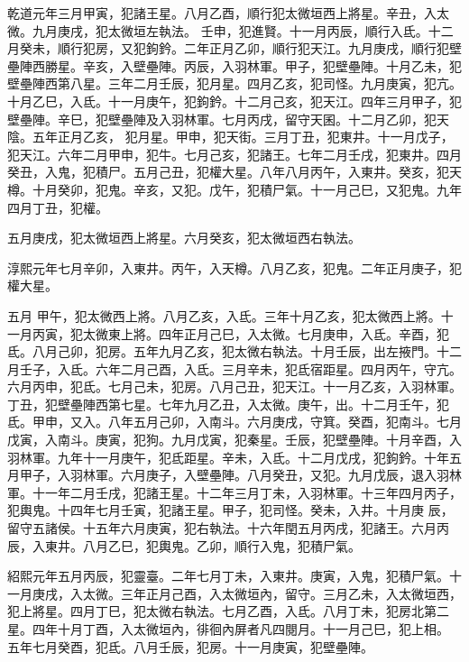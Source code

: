 \begin{pinyinscope}
 乾道元年三月甲寅，犯諸王星。八月乙酉，順行犯太微垣西上將星。辛丑，入太微。九月庚戌，犯太微垣左執法。
 壬申，犯進賢。十一月丙辰，順行入氐。十二月癸未，順行犯房，又犯鉤鈐。二年正月乙卯，順行犯天江。九月庚戌，順行犯壁壘陣西勝星。辛亥，入壁壘陣。丙辰，入羽林軍。甲子，犯壁壘陣。十月乙未，犯壁壘陣西第八星。三年二月壬辰，犯月星。四月乙亥，犯司怪。九月庚寅，犯亢。十月乙巳，入氐。十一月庚午，犯鉤鈐。十二月己亥，犯天江。四年三月甲子，犯壁壘陣。辛巳，犯壁壘陣及入羽林軍。七月丙戌，留守天囷。十二月乙卯，犯天陰。五年正月乙亥，
 犯月星。甲申，犯天街。三月丁丑，犯東井。十一月戊子，犯天江。六年二月甲申，犯牛。七月己亥，犯諸王。七年二月壬戌，犯東井。四月癸丑，入鬼，犯積尸。五月己丑，犯權大星。八年八月丙午，入東井。癸亥，犯天樽。十月癸卯，犯鬼。辛亥，又犯。戊午，犯積尸氣。十一月己巳，又犯鬼。九年四月丁丑，犯權。



 五月庚戌，犯太微垣西上將星。六月癸亥，犯太微垣西右執法。



 淳熙元年七月辛卯，入東井。丙午，入天樽。八月乙亥，犯鬼。二年正月庚子，犯權大星。



 五月
 甲午，犯太微西上將。八月乙亥，入氐。三年十月乙亥，犯太微西上將。十一月丙寅，犯太微東上將。四年正月己巳，入太微。七月庚申，入氐。辛酉，犯氐。八月己卯，犯房。五年九月乙亥，犯太微右執法。十月壬辰，出左掖門。十二月壬子，入氐。六年二月己酉，入氐。三月辛未，犯氐宿距星。四月丙午，守亢。六月丙申，犯氐。七月己未，犯房。八月己丑，犯天江。十一月乙亥，入羽林軍。丁丑，犯壁壘陣西第七星。七年九月乙丑，入太微。庚午，出。十二月壬午，犯
 氐。甲申，又入。八年五月己卯，入南斗。六月庚戌，守箕。癸酉，犯南斗。七月戊寅，入南斗。庚寅，犯狗。九月戊寅，犯秦星。壬辰，犯壁壘陣。十月辛酉，入羽林軍。九年十一月庚午，犯氐距星。辛未，入氐。十二月戊戌，犯鉤鈐。十年五月甲子，入羽林軍。六月庚子，入壁壘陣。八月癸丑，又犯。九月戊辰，退入羽林軍。十一年二月壬戌，犯諸王星。十二年三月丁未，入羽林軍。十三年四月丙子，犯輿鬼。十四年七月壬寅，犯諸王星。甲子，犯司怪。癸未，入井。十月庚
 辰，留守五諸侯。十五年六月庚寅，犯右執法。十六年閏五月丙戌，犯諸王。六月丙辰，入東井。八月乙巳，犯輿鬼。乙卯，順行入鬼，犯積尸氣。



 紹熙元年五月丙辰，犯靈臺。二年七月丁未，入東井。庚寅，入鬼，犯積尸氣。十一月庚戌，入太微。三年正月己酉，入太微垣內，留守。三月乙未，入太微垣西，犯上將星。四月丁巳，犯太微右執法。七月乙酉，入氐。八月丁未，犯房北第二星。四年十月丁酉，入太微垣內，徘徊內屏者凡四閱月。十一月己巳，犯上相。
 五年七月癸酉，犯氐。八月壬辰，犯房。十一月庚寅，犯壁壘陣。




\end{pinyinscope}

